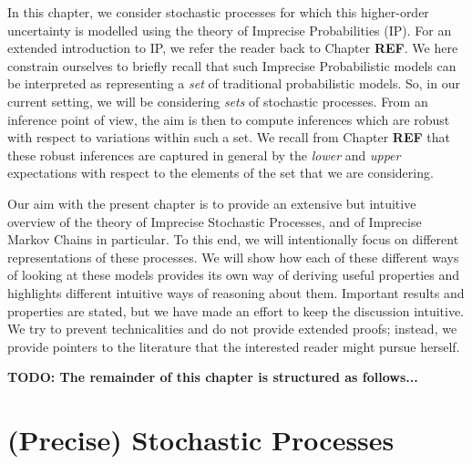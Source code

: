 \documentclass[graybox]{svmult}
\begin{document}
In this chapter, we consider stochastic processes for which this higher-order uncertainty is modelled using the theory of Imprecise Probabilities (IP). For an extended introduction to IP, we refer the reader back to Chapter {\bf REF}. We here constrain ourselves to briefly recall that such Imprecise Probabilistic models can be interpreted as representing a \emph{set} of traditional probabilistic models. So, in our current setting, we will be considering \emph{sets} of stochastic processes. From an inference point of view, the aim is then to compute inferences which are robust with respect to variations within such a set. We recall from Chapter {\bf REF} that these robust inferences are captured in general by the \emph{lower} and \emph{upper} expectations with respect to the elements of the set that we are considering.

Our aim with the present chapter is to provide an extensive but intuitive overview of the theory of Imprecise Stochastic Processes, and of Imprecise Markov Chains in particular. To this end, we will intentionally focus on different representations of these processes. We will show how each of these different ways of looking at these models provides its own way of deriving useful properties and highlights different intuitive ways of reasoning about them. Important results and properties are stated, but we have made an effort to keep the discussion intuitive. We try to prevent technicalities and do not provide extended proofs; instead, we provide pointers to the literature that the interested reader might pursue herself.

{\bf TODO: The remainder of this chapter is structured as follows...}

\section{(Precise) Stochastic Processes}\label{sec:prec_stoch_proc}

\end{document}
